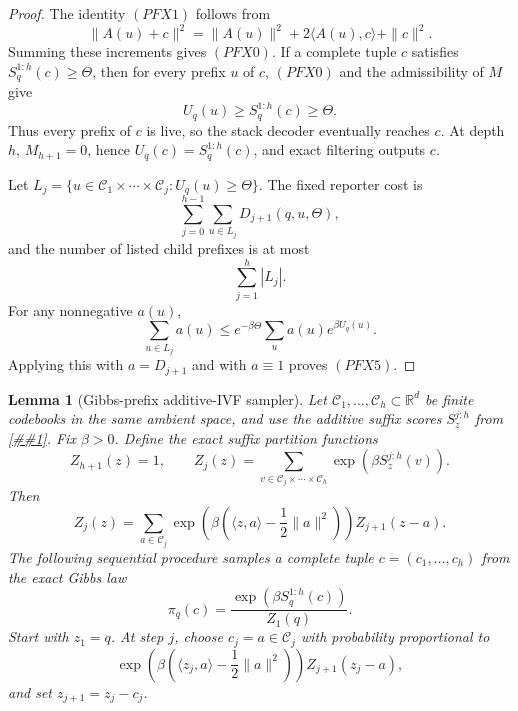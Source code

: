 \documentclass[10pt]{article}
\newcommand{\cref}[1]{\ref{##1}}
\newtheorem{lemma}[theorem]{Lemma}
\theoremstyle{definition}
\newcommand{\ip}[2]{\langle #1,#2\rangle}
\begin{document}
\begin{proof}
   The identity \((PFX1)\) follows from
   \[
      \|A(u)+c\|^2=\|A(u)\|^2+2\ip{A(u)}{c}+\|c\|^2.
   \]
   Summing these increments gives \((PFX0)\).  If a complete tuple \(c\)
   satisfies \(S_q^{1:h}(c)\ge\Theta\), then for every prefix \(u\) of \(c\),
   \((PFX0)\) and the admissibility of \(M\) give
   \[
      U_q(u)\ge S_q^{1:h}(c)\ge\Theta .
   \]
   Thus every prefix of \(c\) is live, so the stack decoder eventually reaches
   \(c\).  At depth \(h\), \(M_{h+1}=0\), hence \(U_q(c)=S_q^{1:h}(c)\), and
   exact filtering outputs \(c\).

   Let \(L_j=\{u\in\mathcal C_1\times\cdots\times\mathcal C_j:U_q(u)\ge
   \Theta\}\).  The fixed reporter cost is
   \[
      \sum_{j=0}^{h-1}\sum_{u\in L_j}D_{j+1}(q,u,\Theta),
   \]
   and the number of listed child prefixes is at most
   \[
      \sum_{j=1}^h |L_j|.
   \]
   For any nonnegative \(a(u)\),
   \[
      \sum_{u\in L_j}a(u)
      \le
      e^{-\beta\Theta}\sum_u a(u)e^{\beta U_q(u)}.
   \]
   Applying this with \(a=D_{j+1}\) and with \(a\equiv1\) proves \((PFX5)\).
\end{proof}

\begin{lemma}[Gibbs-prefix additive-IVF sampler]
   \label{lem:gibbs-prefix-additive-ivf-sampler}
   Let \(\mathcal C_1,\ldots,\mathcal C_h\subset\mathbb R^d\) be finite
   codebooks in the same ambient space, and use the additive suffix scores
   \(S_z^{j:h}\) from \cref{lem:priced-prefix-additive-ivf-reporter}.  Fix
   \(\beta>0\).  Define the exact suffix partition functions
   \[
      Z_{h+1}(z)=1,
      \qquad
      Z_j(z)=
      \sum_{v\in\mathcal C_j\times\cdots\times\mathcal C_h}
      \exp\!\left(\beta S_z^{j:h}(v)\right).
   \]
   Then
   \[
      Z_j(z)=
      \sum_{a\in\mathcal C_j}
      \exp\!\left(\beta\left(\ip{z}{a}-\frac12\|a\|^2\right)\right)
      Z_{j+1}(z-a).
      \tag{GPS1}
   \]
   The following sequential procedure samples a complete tuple
   \(c=(c_1,\ldots,c_h)\) from the exact Gibbs law
   \[
      \pi_q(c)=
      \frac{\exp(\beta S_q^{1:h}(c))}{Z_1(q)}.
      \tag{GPS2}
   \]
   Start with \(z_1=q\).  At step \(j\), choose \(c_j=a\in\mathcal C_j\) with
   probability proportional to
   \[
      \exp\!\left(\beta\left(\ip{z_j}{a}-\frac12\|a\|^2\right)\right)
      Z_{j+1}(z_j-a),
      \tag{GPS3}
   \]
   and set \(z_{j+1}=z_j-c_j\).
\end{lemma}
\end{document}
